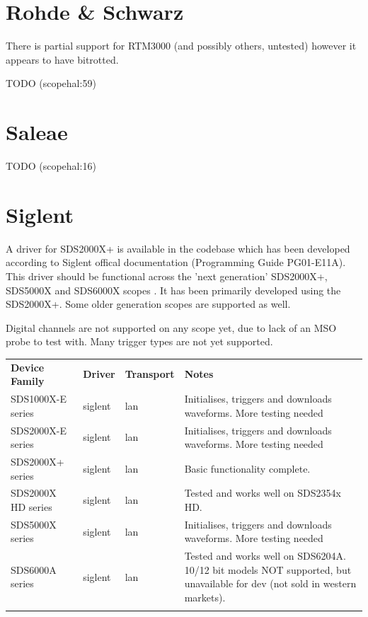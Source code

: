 \section{Rohde \& Schwarz}

There is partial support for RTM3000 (and possibly others, untested) however it appears to have bitrotted.

TODO (scopehal:59)

\section{Saleae}
TODO (scopehal:16)

\section{Siglent}

A driver for SDS2000X+ is available in the codebase which has been developed according to Siglent offical documentation
(Programming Guide PG01-E11A). This driver should be functional across the 'next generation' SDS2000X+, SDS5000X and
SDS6000X scopes . It has been primarily developed using the SDS2000X+. Some older generation scopes are supported as well.

Digital channels are not supported on any scope yet, due to lack of an MSO probe to test with. Many trigger types are
not yet supported.

\begin{tabularx}{16cm}{lllX}
\thickhline
\textbf{Device Family} & \textbf{Driver} & \textbf{Transport} & \textbf{Notes} \\
\thickhline
SDS1000X-E series & siglent & lan & Initialises, triggers and downloads waveforms. More testing needed \\
\thickhline
SDS2000X-E series & siglent & lan & Initialises, triggers and downloads waveforms. More testing needed \\
\thickhline
SDS2000X+ series & siglent & lan & Basic functionality complete. \\
\thickhline
SDS2000X HD series & siglent & lan & Tested and works well on SDS2354x HD. \\
\thickhline
SDS5000X series & siglent & lan & Initialises, triggers and downloads waveforms. More testing needed \\
\thickhline
SDS6000A series & siglent & lan & Tested and works well on SDS6204A. 10/12 bit models NOT supported, but unavailable for dev (not sold in western markets). \\
\thickhline
\end{tabularx}

